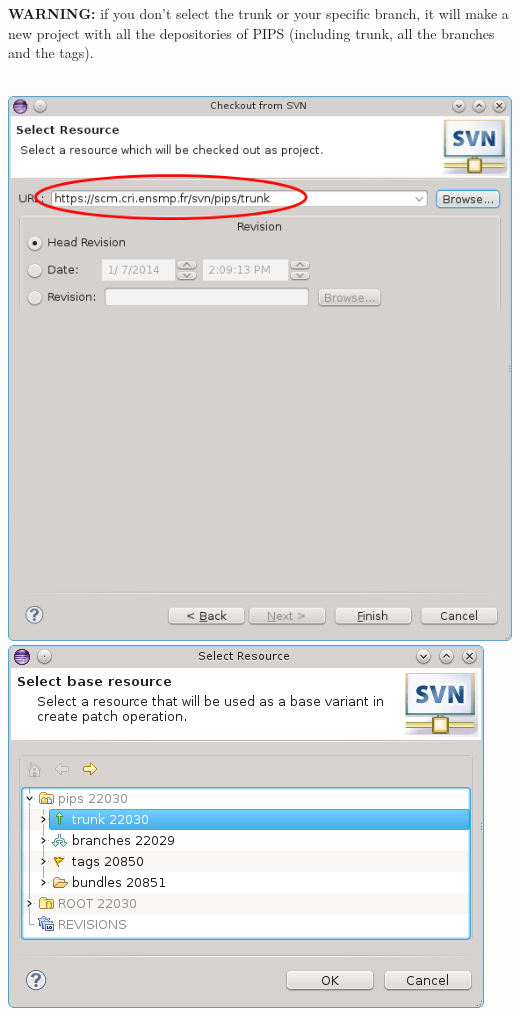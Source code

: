 \documentclass[a4paper]{article}
\begin{document}
\begin{enumerate}
\begin{enumerate}
{\color{red}\textbf{\color{red} WARNING:} if you don't select the trunk or your specific branch, it will make a new project with all the depositories of PIPS (including trunk, all the branches and the tags).}
\begin{center}
\noindent$\!\!\!\!\!\!\!\!\!\!\!\!\!\!\!\!\!\!\!\!\!\!\!\!\!\!\!\!\!\!\!\!\!\!\!\!\!\!\!\!\!\!\!\!\!\!\!\!\!\!\!\!\!\!$
\includegraphics[scale=0.35]{eclipse/03-eclipseJUNO-newSVNProject3.png}
\includegraphics[scale=0.35]{eclipse/03-eclipseJUNO-newSVNProject4.png}
\end{center}


\end{enumerate}
\end{enumerate}
\end{document}
